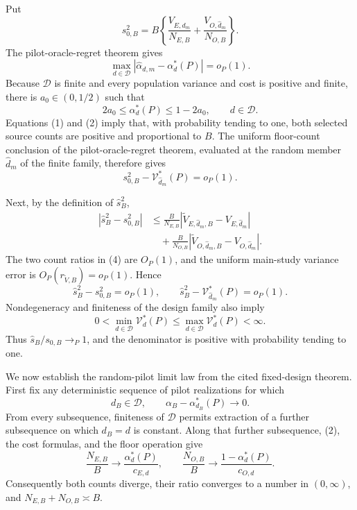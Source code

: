 Put
\[
 s_{0,B}^2
 =B\left\{
 \frac{V_{E,\widehat d_m}}{N_{E,B}}
 +\frac{V_{O,\widehat d_m}}{N_{O,B}}
 \right\}.
\]
The pilot-oracle-regret theorem gives
\[
 \max_{d\in\mathcal D}
 |\widehat\alpha_{d,m}-\alpha_d^*(P)|=o_P(1).                 \tag{1}
\]
Because \(\mathcal D\) is finite and every population variance and cost is positive and finite, there is \(a_0\in(0,1/2)\) such that
\[
 2a_0\le\alpha_d^*(P)\le1-2a_0,
 \qquad d\in\mathcal D.                                     \tag{2}
\]
Equations (1) and (2) imply that, with probability tending to one, both selected source counts are positive and proportional to \(B\).  The uniform floor-count conclusion of the pilot-oracle-regret theorem, evaluated at the random member \(\widehat d_m\) of the finite family, therefore gives
\[
 s_{0,B}^2-\mathcal V_{\widehat d_m}^*(P)=o_P(1).             \tag{3}
\]

Next, by the definition of \(\widehat s_B^2\),
\[
\begin{aligned}
 |\widehat s_B^2-s_{0,B}^2|
 &\le \frac{B}{N_{E,B}}
       |\widetilde V_{E,\widehat d_m,B}-V_{E,\widehat d_m}|\\
 &\quad+\frac{B}{N_{O,B}}
       |\widetilde V_{O,\widehat d_m,B}-V_{O,\widehat d_m}|.
\end{aligned}                                                     \tag{4}
\]
The two count ratios in (4) are \(O_P(1)\), and the uniform main-study variance error is \(O_P(r_{\widetilde V,B})=o_P(1)\).  Hence
\[
 \widehat s_B^2-s_{0,B}^2=o_P(1),
 \qquad
 \widehat s_B^2-\mathcal V_{\widehat d_m}^*(P)=o_P(1).       \tag{5}
\]
Nondegeneracy and finiteness of the design family also imply
\[
 0<\min_{d\in\mathcal D}\mathcal V_d^*(P)
 \le\max_{d\in\mathcal D}\mathcal V_d^*(P)<\infty.         \tag{6}
\]
Thus \(\widehat s_B/s_{0,B}\to_P1\), and the denominator is positive with probability tending to one.

We now establish the random-pilot limit law from the cited fixed-design theorem.  First fix any deterministic sequence of pilot realizations for which
\[
 d_B\in\mathcal D,
 \qquad
 \alpha_B-\alpha_{d_B}^*(P)\longrightarrow0.                 \tag{7}
\]
From every subsequence, finiteness of \(\mathcal D\) permits extraction of a further subsequence on which \(d_B=d\) is constant.  Along that further subsequence, (2), the cost formulas, and the floor operation give
\[
 \frac{N_{E,B}}{B}\longrightarrow
 \frac{\alpha_d^*(P)}{c_{E,d}},
 \qquad
 \frac{N_{O,B}}{B}\longrightarrow
 \frac{1-\alpha_d^*(P)}{c_{O,d}}.                            \tag{8}
\]
Consequently both counts diverge, their ratio converges to a number in \((0,\infty)\), and \(N_{E,B}+N_{O,B}\asymp B\).

